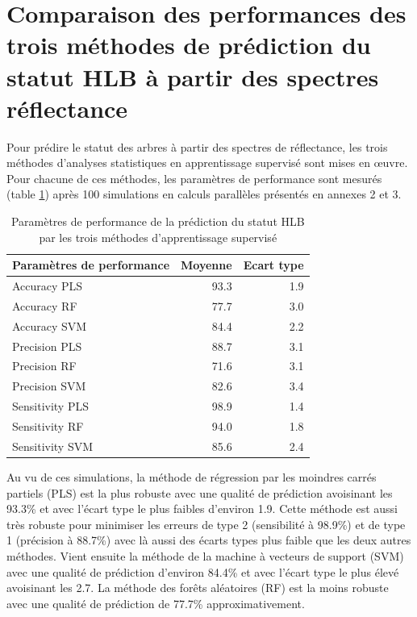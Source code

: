 \documentclass[
  11pt,
  french,
  a4paper,
  extrafontsizes,onecolumn,openright
  ]{memoir}
\begin{document}
\vfill
\newpage

\hypertarget{comparaison-des-performances-des-trois-muxe9thodes-de-pruxe9diction-du-statut-hlb-uxe0-partir-des-spectres-ruxe9flectance}{%
\section{Comparaison des performances des trois méthodes de prédiction du statut HLB à partir des spectres réflectance}\label{comparaison-des-performances-des-trois-muxe9thodes-de-pruxe9diction-du-statut-hlb-uxe0-partir-des-spectres-ruxe9flectance}}

Pour prédire le statut des arbres à partir des spectres de réflectance, les trois méthodes d'analyses statistiques en apprentissage supervisé sont mises en œuvre. Pour chacune de ces méthodes, les paramètres de performance sont mesurés (table \ref{tab:T2}) après 100 simulations en calculs parallèles présentés en annexes 2 et 3.

\scriptsize

\begin{longtable}[t]{lrr}
\caption{\label{tab:T2}Paramètres de performance de la prédiction du statut HLB par les trois méthodes d'apprentissage supervisé}\\
\toprule
Paramètres de performance & Moyenne & Ecart type\\
\midrule
Accuracy PLS & 93.3 & 1.9\\
Accuracy RF & 77.7 & 3.0\\
Accuracy SVM & 84.4 & 2.2\\
Precision PLS & 88.7 & 3.1\\
Precision RF & 71.6 & 3.1\\
\addlinespace
Precision SVM & 82.6 & 3.4\\
Sensitivity PLS & 98.9 & 1.4\\
Sensitivity RF & 94.0 & 1.8\\
Sensitivity SVM & 85.6 & 2.4\\
\bottomrule
\end{longtable}

\normalsize

Au vu de ces simulations, la méthode de régression par les moindres carrés partiels (PLS) est la plus robuste avec une qualité de prédiction avoisinant les 93.3\% et avec l'écart type le plus faibles d'environ 1.9.
Cette méthode est aussi très robuste pour minimiser les erreurs de type 2 (sensibilité à 98.9\%) et de type 1 (précision à 88.7\%) avec là aussi des écarts types plus faible que les deux autres méthodes.
Vient ensuite la méthode de la machine à vecteurs de support (SVM) avec une qualité de prédiction d'environ 84.4\% et avec l'écart type le plus élevé avoisinant les 2.7. La méthode des forêts aléatoires (RF) est la moins robuste avec une qualité de prédiction de 77.7\% approximativement.
\end{document}
